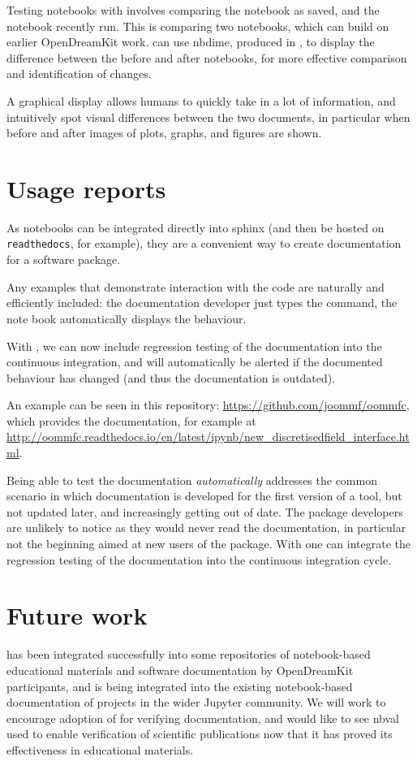 \documentclass{deliverablereport}
\begin{document}
Testing notebooks with \nbval involves comparing the notebook as saved,
and the notebook recently run.
This is comparing two notebooks,
which can build on earlier OpenDreamKit work.
\nbval can use nbdime, produced in ,
to display the difference between the before and after notebooks,
for more effective comparison and identification of changes.

A graphical display allows humans to quickly take in a lot of
information, and intuitively spot visual differences between the
two documents, in particular when before and after images of
plots, graphs, and figures are shown.

\section{Usage reports}

As notebooks can be integrated directly into sphinx (and then be
hosted on \texttt{readthedocs}, for example), they are a convenient
way to create documentation for a software package.

Any examples that demonstrate interaction with the code are naturally
and efficiently included: the documentation developer just types the
command, the note book automatically displays the behaviour.

With \nbval, we can now include regression testing of the
documentation into the continuous integration, and will automatically
be alerted if the documented behaviour has changed (and thus the
documentation is outdated).

An example can be seen in this repository:
\href{https://github.com/joommf/oommfc}{https://github.com/joommf/oommfc},
which provides the documentation, for example at\linebreak
\href{http://oommfc.readthedocs.io/en/latest/ipynb/new_discretisedfield_interface.html}{http://oommfc.readthedocs.io/en/latest/ipynb/new\_discretisedfield\_interface.html}.

Being able to test the documentation \emph{automatically} addresses
the common scenario in which documentation is developed for the first
version of a tool, but not updated later, and increasingly getting out
of date. The package developers are unlikely to notice as they would
never read the documentation, in particular not the beginning aimed at
new users of the package. With \nbval one can integrate the regression
testing of the documentation into the continuous integration cycle.


\section{Future work} %

\nbval has been integrated successfully into some repositories of
notebook-based educational materials and software documentation by
OpenDreamKit participants, and is being integrated into the existing
notebook-based documentation of projects in the wider Jupyter
community.  We will work to encourage adoption of \nbval for verifying
documentation, and would like to see nbval used to enable verification
of scientific publications now that it has proved its effectiveness in
educational materials.

\printbibliography
\end{document}
